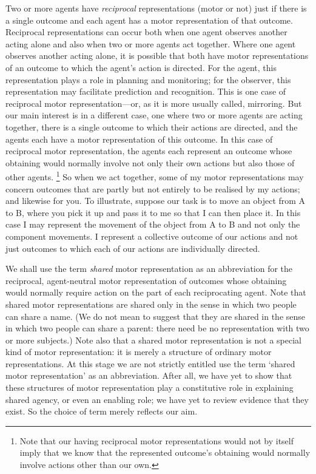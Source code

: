 \documentclass[12pt,\papersize]{extarticle}
\begin{document}
Two or more agents have \emph{reciprocal} representations (motor or not) just if there is a single outcome and each agent has a motor representation of that outcome. 
Reciprocal representations can occur both when one agent observes another acting alone and also when two or more agents act together.
Where one agent observes another acting alone,
it is possible that both have motor representations of an outcome to which the agent's action is directed.
For the agent, this representation plays a role in planning and monitoring; for the observer, this representation may facilitate prediction and recognition.
This is one case of reciprocal motor representation---or, as it is more usually called, mirroring.
But our main interest is in a different case,
one where two or more agents are acting together,
 there is a single outcome to which their actions are directed,
 and the agents each have a motor representation of this outcome.
In this case of reciprocal motor representation, the agents each represent an outcome whose obtaining would normally involve not only their own actions but also those of other agents.%
\footnote{ 
	Note that our having reciprocal motor representations would not by itself imply that we know that the represented outcome's obtaining would normally involve actions other than our own.
}
So when we act together, some of my motor representations may concern outcomes that are partly but not entirely to be realised by my actions; and likewise for you.
To illustrate, suppose our task is to move an object from A to B, where you pick it up and pass it to me so that I can then place it.
In this case I may represent the movement of the object from A to B and not only the component movements.
I represent a collective outcome of our actions and not just outcomes to which each of our actions are individually directed.
%

We shall use the term \emph{shared} motor representation as an abbreviation for the reciprocal, agent-neutral motor representation of outcomes whose obtaining would normally require action on the part of each reciprocating agent. 
Note that shared motor representations are shared only in the sense in which two people can share a name.  
(We do not mean to suggest that they are shared in the sense in which two people can share a parent: there need be no representation with two or more subjects.)
Note also that a shared motor representation is not a special kind of motor representation: it is merely a structure of ordinary motor representations. 
At this stage we are not strictly entitled use the term `shared motor representation' as an abbreviation.
After all, we have yet to show that these structures of motor representation play a constitutive role in explaining shared agency, or even an enabling role; 
we have yet to review evidence that they exist.
So the choice of term merely reflects our aim. 
\end{document}
